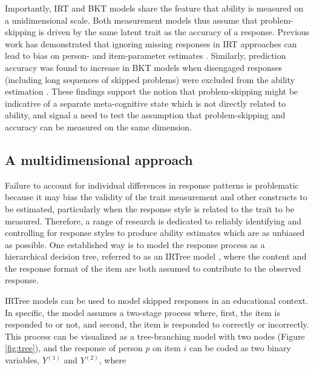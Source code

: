 \documentclass{edm_article}
\begin{document}
Importantly, IRT and BKT models share the feature that ability is measured on a unidimensional scale. Both measurement models thus assume that problem-skipping is driven by the same latent trait as the accuracy of a response. Previous work has demonstrated that ignoring missing responses in IRT approaches can lead to bias on person- and item-parameter estimates \cite{finch2008estimation, mislevy1996missing, pohl2014dealing, holman2005modelling, debeer2017modeling}. Similarly, prediction accuracy was found to increase in BKT models when disengaged responses (including long sequences of skipped problems) were excluded from the ability estimation \cite{gorgun2022considering}. These findings support the notion that problem-skipping might be indicative of a separate meta-cognitive state which is not directly related to ability, and signal a need to test the assumption that problem-skipping and accuracy can be measured on the same dimension. 

\vspace*{2em} %
\subsection{A multidimensional approach}
Failure to account for individual differences in response patterns is problematic because it may bias the validity of the trait measurement and other constructs to be estimated,  particularly when the response style is related to the trait to be measured. Therefore, a range of research is dedicated to reliably identifying and controlling for response styles to produce ability estimates which are as unbiased as possible. One established way is to model the response process as a hierarchical decision tree, referred to as an IRTree model \cite{de2012irtrees}, where the content and the response format of the item are both assumed to contribute to the observed response\cite{bockenholt2012modeling, de2012irtrees, thissen2013two}.

IRTree models can be used to model skipped responses in an educational context. In specific, the model assumes a two-stage process where, first, the item is responded to or not, and second, the item is responded to correctly or incorrectly. This process can be visualized as a tree-branching model with two nodes (Figure \ref{fig:tree}), and the response of person $p$ on item $i$ can be coded as two binary variables, $Y^{(1)}$ and $Y^{(2)}$, where 
\end{document}
